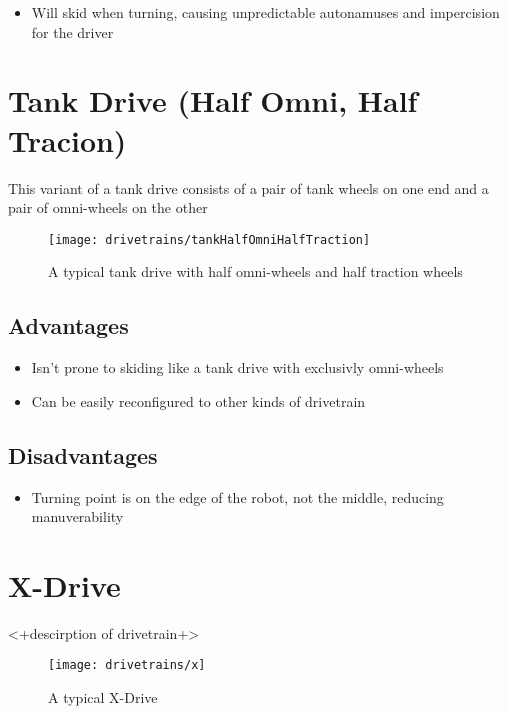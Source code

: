 \documentclass[../../main.tex]{subfiles}
\begin{document}
\begin{itemize} \item Will skid when turning, causing unpredictable autonamuses and impercision for the driver \end{itemize} 

\section{Tank Drive (Half Omni, Half Tracion)} 

This variant of a tank drive consists of a pair of tank wheels on one end and a pair of omni-wheels on the other 

\begin{figure}[h] \centering 

	\texttt{[image: drivetrains/tankHalfOmniHalfTraction]} 
	\caption{A typical tank drive with half omni-wheels and half traction wheels} 
	\label{fig:drivetrainTankHalfHalf} \end{figure} 

\subsection{Advantages} 

\begin{itemize} \item Isn't prone to skiding like a tank drive with exclusivly omni-wheels \item Can be easily reconfigured to other kinds of drivetrain \end{itemize} 

\subsection{Disadvantages} 

\begin{itemize} \item Turning point is on the edge of the robot, not the middle, reducing manuverability \end{itemize} 

\section{X-Drive} 

<+descirption of drivetrain+> \begin{figure}[h] \centering 

	\texttt{[image: drivetrains/x]} 
	\caption{A typical X-Drive} \label{fig:drivetrainX} 
	\end{figure} 
\end{document}
